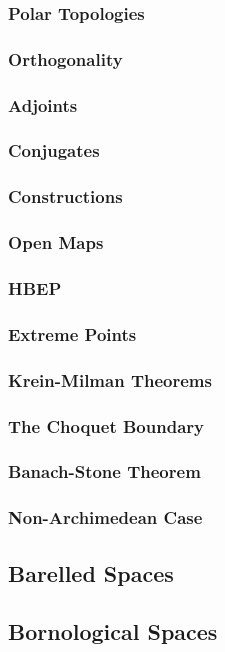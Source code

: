 \documentclass[12pt]{scrartcl}
\renewcommand{\.}{\; . \;}
\begin{document}
\subsubsection{Polar Topologies}
\subsubsection{Orthogonality}
\subsubsection{Adjoints}
\subsubsection{Conjugates}
\subsubsection{Constructions}
\subsubsection{Open Maps}
\subsubsection{HBEP}
\subsubsection{Extreme Points}
\subsubsection{Krein-Milman Theorems}
\subsubsection{The Choquet Boundary}
\subsubsection{Banach-Stone Theorem}
\subsubsection{Non-Archimedean Case}
\subsection{Barelled Spaces}
\subsection{Bornological Spaces}
\end{document}
